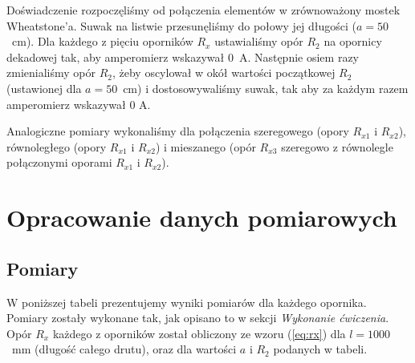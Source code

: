 \documentclass[12pt,a4paper]{article}
\numberwithin{equation}{section}
\begin{document}
Doświadczenie rozpoczęliśmy od połączenia elementów w zrównoważony mostek Wheatstone'a. Suwak na listwie przesunęliśmy do połowy jej długości ($a = 50$~cm). Dla każdego z pięciu oporników $R_x$ ustawialiśmy opór $R_2$ na opornicy dekadowej tak, aby amperomierz wskazywał $0$~A. Następnie osiem razy zmienialiśmy opór $R_2$, żeby oscylował w okół wartości początkowej $R_2$ (ustawionej dla $a = 50$~cm) i dostosowywaliśmy suwak, tak aby za każdym razem amperomierz wskazywał $0$ A.

Analogiczne pomiary wykonaliśmy dla połączenia szeregowego (opory $R_{x1}$ i $R_{x2}$), równoległego (opory $R_{x1}$ i $R_{x2}$) i mieszanego (opór $R_{x3}$ szeregowo z równolegle połączonymi oporami $R_{x1}$ i $R_{x2}$).

\pagebreak
\section{Opracowanie danych pomiarowych}
\subsection{Pomiary}
W poniższej tabeli prezentujemy wyniki pomiarów dla każdego opornika. Pomiary zostały wykonane tak, jak opisano to w sekcji \emph{Wykonanie ćwiczenia}. Opór $R_x$ każdego z oporników został obliczony ze wzoru (\ref{eq:rx}) dla $l = 1000$~mm (długość całego drutu), oraz dla wartości $a$ i $R_2$ podanych w tabeli.
\end{document}
